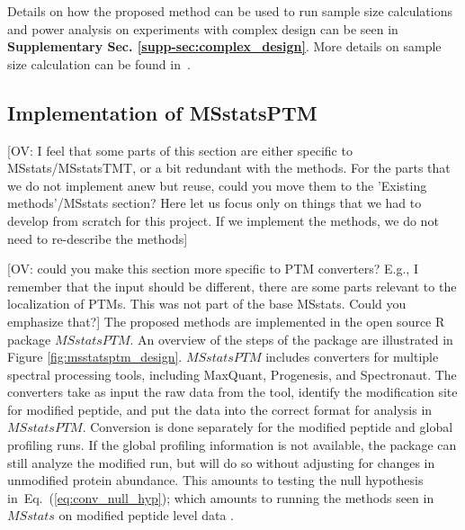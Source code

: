 \documentclass[mcp]{article}
\numberwithin{table}{section}
\def\todo#1{{\color{red}[#1]}}
\def\eqref#1{Eq.~(\ref{eq:#1})}
\begin{document}
Details on how the proposed method can be used to run sample size calculations and power analysis on experiments with complex design can be seen in {\bf Supplementary Sec. \ref{supp-sec:complex_design}}. More details on sample size calculation can be found in~\cite{oberg_vitek_09a}. 



\subsection*{Implementation of MSstatsPTM}

\todo{OV: I feel that some parts of this section are either specific to MSstats/MSstatsTMT, or a bit redundant with the methods. For the parts that we do not implement anew but reuse, could you move them to the 'Existing methods'/MSstats section? Here let us focus only on things that we had to develop from scratch for this project. If we implement the methods, we do not need to re-describe the methods}

\todo{OV: could you make this section more specific to PTM converters? E.g., I remember that the input should be different, there are some parts relevant to the localization of PTMs. This was not part of the base MSstats. Could you emphasize that?} The proposed methods are implemented in the open source R package $MSstatsPTM$. An overview of the steps of the package are illustrated in Figure \ref{fig:msstatsptm_design}. $MSstatsPTM$ includes converters for multiple spectral processing tools, including MaxQuant, Progenesis, and Spectronaut. The converters take as input the raw data from the tool, identify the modification site for modified peptide, and put the data into the correct format for analysis in $MSstatsPTM$. Conversion is done separately for the modified peptide and global profiling runs. If the global profiling information is not available, the package can still analyze the modified run, but will do so without adjusting for changes in unmodified protein abundance. This amounts to testing the null hypothesis in~\eqref{conv_null_hyp}; which amounts to running the methods seen in $MSstats$ on modified peptide level data \cite{Choi:2014} \cite{Huang:2020}.
\end{document}
